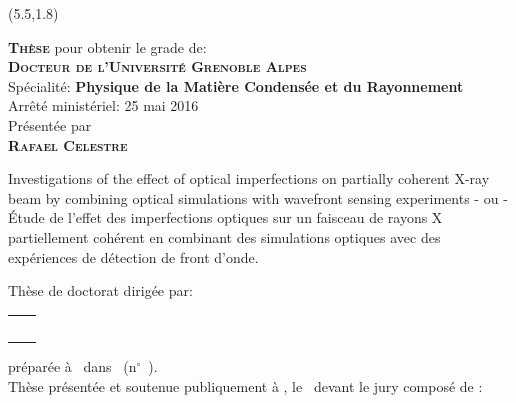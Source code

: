 \documentclass[a4paper, twoside]{report}
\newcommand{\thesisTitle}{Investigations of the effect of optical imperfections on partially coherent X-ray beam by combining optical simulations with wavefront sensing experiments}
\newcommand{\thesisTitleFR}{\'Etude de l'effet des imperfections optiques sur un faisceau de rayons X partiellement cohérent en combinant des simulations optiques avec des expériences de détection de front d'onde.}
\begin{document}
\begin{singlespace}
\begin{textblock}{10}(5.5,1.8)
	\color{black}

	\begin{flushleft}
	    \large \textbf{\textsc{Thèse}} pour obtenir le grade de:\\ \bigskip \vfill  
	    \Large \textbf{\textsc{Docteur de l’Université Grenoble Alpes}} \\
        \large Spécialité: \textbf{Physique de la Matière Condensée et du Rayonnement}\\
        \small Arrêté ministériel: 25 mai 2016\\ \bigskip \vfill  
        \large Présentée par\\ \bigskip \vfill 
        \Large \textbf{\textsc{Rafael Celestre}}\\ \bigskip \vfill 
	\end{flushleft}
	\begin{center}
		\Large{\thesisTitle} \bigskip %
		\vfill
		\large{- ou -} \bigskip
		\vfill
		\Large{\thesisTitleFR} \bigskip %
		\vfill
	\end{center}
	\begin{flushleft}
		\small Thèse de doctorat dirigée par: \\ \bigskip
		\small
		\begin{tabular}{@{} L{9.5cm} R{4.5cm}}
    		\jurynameE  \\ \juryadressE & \juryroleE \\
    		\jurynameF  \\ \juryadressF & \juryroleF  \\ \bigskip
	\end{tabular} 
		\small préparée à \PhDworkingplace~dans \ecodoctitle~(n$^{\circ}$~\ecodocnum).\\ \bigskip
		\vfill
		Thèse présentée et soutenue publiquement à , le ~devant le jury composé de :
	\end{flushleft}
	\small


\end{textblock}
\end{singlespace}
\end{document}

